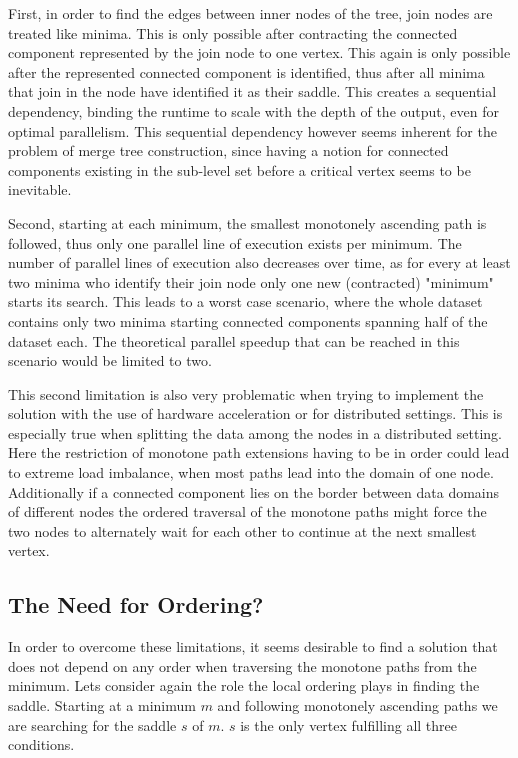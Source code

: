 \documentclass{scrartcl}
\begin{document}
First, in order to find the edges between inner nodes of the tree, join nodes are treated like minima. This is only possible after contracting the connected component represented by the join node to one vertex. This again is only possible after the represented connected component is identified, thus after all minima that join in the node have identified it as their saddle. This creates a sequential dependency, binding the runtime to scale with the depth of the output, even for optimal parallelism. This sequential dependency however seems inherent for the problem of merge tree construction, since having a notion for connected components existing in the sub-level set before a critical vertex seems to be inevitable. 

Second, starting at each minimum, the smallest monotonely ascending path is followed, thus only one parallel line of execution exists per minimum. The number of parallel lines of execution also decreases over time, as for every at least two minima who identify their join node only one new (contracted) "minimum" starts its search. This leads to a worst case scenario, where the whole dataset contains only two minima starting connected components spanning half of the dataset each. The theoretical parallel speedup that can be reached in this scenario would be limited to two.

This second limitation is also very problematic when trying to implement the solution with the use of hardware acceleration or for distributed settings. This is especially true when splitting the data among the nodes in a distributed setting. Here the restriction of monotone path extensions having to be in order could lead to extreme load imbalance, when most paths lead into the domain of one node. Additionally if a connected component lies on the border between data domains of different nodes the ordered traversal of the monotone paths might force the two nodes to alternately wait for each other to continue at the next smallest vertex.

\subsection{The Need for Ordering?}
In order to overcome these limitations, it seems desirable to find a solution that does not depend on any order when traversing the monotone paths from the minimum. Lets consider again the role the local ordering plays in finding the saddle. Starting at a minimum \(m\) and following monotonely ascending paths we are searching for the saddle \(s\) of \(m\). \(s\) is the only vertex fulfilling all three conditions.
\end{document}
